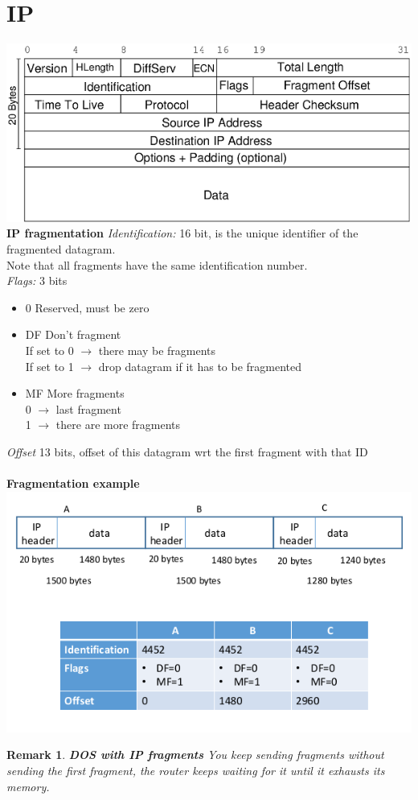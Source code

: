 \documentclass[10pt,a4paper]{book}
\newtheorem{remark}{Remark}
\begin{document}
\section{IP}
\includegraphics[scale=0.5]{img/ip.png}\\
\textbf{IP fragmentation}
\emph{Identification:} 16 bit, is the unique identifier of the fragmented datagram.\\
Note that all fragments have the same identification number.\\
\emph{Flags:} 3 bits
\begin{itemize}
\item 0 Reserved, must be zero
\item DF Don't fragment\\
If set to 0 $\to$ there may be fragments\\
If set to 1 $\to$ drop datagram if it has to be fragmented
\item MF More fragments\\
0 $\to$ last fragment\\
1 $\to$ there are more fragments
\end{itemize}
\emph{Offset} 13 bits, offset of this datagram wrt the first fragment with that ID\\\\
\textbf{Fragmentation example}\\
\includegraphics[scale=0.6]{img/fragmentation.png}\\
\begin{remark}
\textbf{DOS with IP fragments}
You keep sending fragments without sending the first fragment, the router keeps waiting for it until it exhausts its memory.
\end{remark}
\newpage
\end{document}
